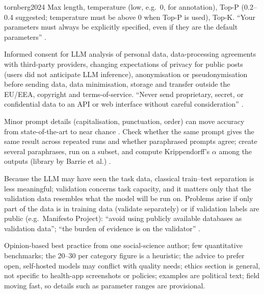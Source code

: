 \begin{papercard}{tornberg2024}
 Max length, temperature (low, e.g.\ 0, for annotation), Top-P (0.2--0.4 suggested; temperature must be above 0 when Top-P is used), Top-K. ``Your parameters must always be explicitly specified, even if they are the default parameters'' .

 Informed consent for LLM analysis of personal data, data-processing agreements with third-party providers, changing expectations of privacy for public posts (users did not anticipate LLM inference), anonymisation or pseudonymisation before sending data, data minimisation, storage and transfer outside the EU/EEA, copyright and terms-of-service. ``Never send proprietary, secret, or confidential data to an API or web interface without careful consideration'' .

 Minor prompt details (capitalisation, punctuation, order) can move accuracy from state-of-the-art to near chance . Check whether the same prompt gives the same result across repeated runs and whether paraphrased prompts agree; create several paraphrases, run on a subset, and compute Krippendorff's $\alpha$ among the outputs (library by Barrie et al.) .

 Because the LLM may have seen the task data, classical train--test separation is less meaningful; validation concerns task capacity, and it matters only that the validation data resembles what the model will be run on. Problems arise if only part of the data is in training data (validate separately) or if validation labels are public (e.g.\ Manifesto Project): ``avoid using publicly available databases as validation data''; ``the burden of evidence is on the validator'' .

 Opinion-based best practice from one social-science author; few quantitative benchmarks; the 20--30 per category figure is a heuristic; the advice to prefer open, self-hosted models may conflict with quality needs; ethics section is general, not specific to health-app screenshots or policies; examples are political text; field moving fast, so details such as parameter ranges are provisional.


\end{papercard}
